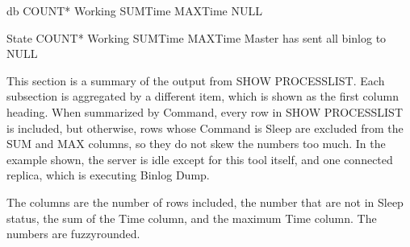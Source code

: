 \documentclass[letterpaper,10pt,english]{sphinxmanual}
\begin{document}
\begin{sphinxVerbatim}[commandchars=\\\{\}]
  db                             COUNT* Working SUMTime MAXTime
  \PYGZhy{}\PYGZhy{}\PYGZhy{}\PYGZhy{}\PYGZhy{}\PYGZhy{}\PYGZhy{}\PYGZhy{}\PYGZhy{}\PYGZhy{}\PYGZhy{}\PYGZhy{}\PYGZhy{}\PYGZhy{}\PYGZhy{}\PYGZhy{}\PYGZhy{}\PYGZhy{}\PYGZhy{}\PYGZhy{}\PYGZhy{}\PYGZhy{}\PYGZhy{}\PYGZhy{}\PYGZhy{}\PYGZhy{}\PYGZhy{}\PYGZhy{}\PYGZhy{}\PYGZhy{} \PYGZhy{}\PYGZhy{}\PYGZhy{}\PYGZhy{}\PYGZhy{}\PYGZhy{}\PYGZhy{}\PYGZhy{} \PYGZhy{}\PYGZhy{}\PYGZhy{}\PYGZhy{}\PYGZhy{}\PYGZhy{}\PYGZhy{} \PYGZhy{}\PYGZhy{}\PYGZhy{}\PYGZhy{}\PYGZhy{}\PYGZhy{}\PYGZhy{}\PYGZhy{}\PYGZhy{} \PYGZhy{}\PYGZhy{}\PYGZhy{}\PYGZhy{}\PYGZhy{}\PYGZhy{}\PYGZhy{}\PYGZhy{}\PYGZhy{}
  NULL                                                 

  State                          COUNT* Working SUMTime MAXTime
  \PYGZhy{}\PYGZhy{}\PYGZhy{}\PYGZhy{}\PYGZhy{}\PYGZhy{}\PYGZhy{}\PYGZhy{}\PYGZhy{}\PYGZhy{}\PYGZhy{}\PYGZhy{}\PYGZhy{}\PYGZhy{}\PYGZhy{}\PYGZhy{}\PYGZhy{}\PYGZhy{}\PYGZhy{}\PYGZhy{}\PYGZhy{}\PYGZhy{}\PYGZhy{}\PYGZhy{}\PYGZhy{}\PYGZhy{}\PYGZhy{}\PYGZhy{}\PYGZhy{}\PYGZhy{} \PYGZhy{}\PYGZhy{}\PYGZhy{}\PYGZhy{}\PYGZhy{}\PYGZhy{}\PYGZhy{}\PYGZhy{} \PYGZhy{}\PYGZhy{}\PYGZhy{}\PYGZhy{}\PYGZhy{}\PYGZhy{}\PYGZhy{} \PYGZhy{}\PYGZhy{}\PYGZhy{}\PYGZhy{}\PYGZhy{}\PYGZhy{}\PYGZhy{}\PYGZhy{}\PYGZhy{} \PYGZhy{}\PYGZhy{}\PYGZhy{}\PYGZhy{}\PYGZhy{}\PYGZhy{}\PYGZhy{}\PYGZhy{}\PYGZhy{}
  Master has sent all binlog to                        
  NULL                                                           
\end{sphinxVerbatim}

This section is a summary of the output from SHOW PROCESSLIST. Each sub\sphinxhyphen{}section
is aggregated by a different item, which is shown as the first column heading.
When summarized by Command, every row in SHOW PROCESSLIST is included, but
otherwise, rows whose Command is Sleep are excluded from the SUM and MAX
columns, so they do not skew the numbers too much. In the example shown, the
server is idle except for this tool itself, and one connected replica, which
is executing Binlog Dump.

The columns are the number of rows included, the number that are not in Sleep
status, the sum of the Time column, and the maximum Time column. The numbers are
fuzzy\sphinxhyphen{}rounded.
\end{document}
